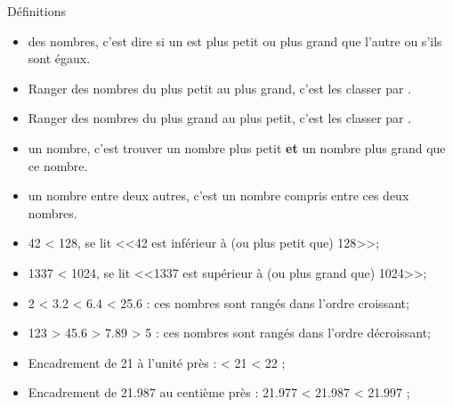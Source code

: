\documentclass[xcolor={dvipsnames}]{beamer}
\begin{document}
\begin{frame}
	\begin{alertblock}{Définitions}
	
			\begin{itemize}
				\item {} des nombres, c'est dire si un est plus petit ou plus grand que l'autre ou s'ils sont égaux.\pause
				
				\item Ranger des nombres du plus petit au plus grand, c'est les classer par .\pause
				
				\item Ranger des nombres du plus grand au plus petit, c'est les classer par .\pause
				
				\item {} un nombre, c'est trouver un nombre plus petit \textbf{et} un nombre plus grand que ce nombre.\pause
				
				\item {} un nombre entre deux autres, c'est un nombre compris entre ces deux nombres.
			\end{itemize}
			
	\end{alertblock}
\end{frame}

\begin{frame}
	\begin{myexs}
		\begin{itemize}
			\item 42 < 128, se lit \pause <<42 est inférieur à (ou plus petit que) 128>>;\pause
			\item 1337 < 1024, se lit \pause <<\num{1337} est supérieur à (ou plus grand que) \num{1024}>>;\pause
			\item 2 < \num{3.2} < \num{6.4} < \num{25.6} : ces nombres sont rangés dans l'ordre \pause croissant;\pause
			\item 123 > \num{45.6} > \num{7.89} > \num{5} : ces nombres sont rangés dans l'ordre \pause décroissant;\pause
			\item Encadrement de 21 à l'unité près :  < 21 < 22 ;\pause
			\item Encadrement de \num{21.987} au centième près : \pause \num{21.977} < \num{21.987} < \num{21.997} ;\pause
		\end{itemize}
	\end{myexs}
\end{frame}
\end{document}
